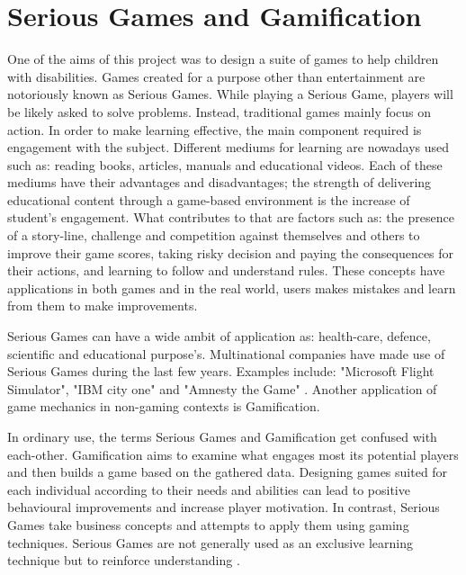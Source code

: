 \section{Serious Games and Gamification}
One of the aims of this project was to design a suite of games to help children with disabilities. Games created for a purpose other than entertainment are notoriously known as Serious Games. While playing a Serious Game, players will be likely asked to solve problems. Instead, traditional games mainly focus on action. In order to make learning effective, the main component required is engagement with the subject. Different mediums for learning are nowadays used such as: reading books, articles, manuals and educational videos. Each of these mediums have their advantages and disadvantages; the strength of delivering educational content through a game-based environment is the increase of student's engagement. What contributes to that are factors such as: the presence of a story-line, challenge and competition against themselves and others to improve their game scores, taking risky decision and paying the consequences for their actions, and learning to follow and understand rules. These concepts have applications in both games and in the real world, users makes mistakes and learn from them to make improvements. 

Serious Games can have a wide ambit of application as: health-care, defence, scientific and educational purpose's. Multinational companies have made use of Serious Games during the last few years. Examples include: "Microsoft Flight Simulator", "IBM city one" and "Amnesty the Game" \cite{serious}. Another application of game mechanics in non-gaming contexts is Gamification. 

In ordinary use, the terms Serious Games and Gamification get confused with each-other. Gamification aims to examine what engages most its potential players and then builds a game based on the gathered data. Designing games suited for each individual according to their needs and abilities can lead to positive behavioural improvements and increase player motivation. In contrast, Serious Games take business concepts and attempts to apply them using gaming techniques. Serious Games are not generally used as an exclusive learning technique but to reinforce understanding \cite{gamification}.   

